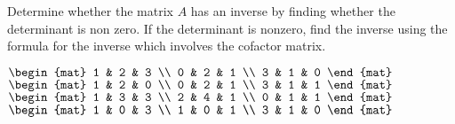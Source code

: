 
\begin{Exercise}[
name={},
title={}, 
difficulty=0,
origin={\cite{KK}}]
Determine whether the matrix $A$ has an inverse by finding whether the
determinant is non zero. If the determinant is nonzero, find the inverse
using the formula for the inverse which involves the cofactor matrix.
\begin{multicols}{2}
\Question $\begin{mat}
1 & 2 & 3 \\
0 & 2 & 1 \\
3 & 1 & 0
\end{mat}$
\Question $\begin{mat}
1 & 2 & 0 \\
0 & 2 & 1 \\
3 & 1 & 1
\end{mat}$
\Question $\begin{mat}
1 & 3 & 3 \\
2 & 4 & 1 \\
0 & 1 & 1
\end{mat}$
\Question $\begin{mat}
1 & 0 & 3 \\
1 & 0 & 1 \\
3 & 1 & 0
\end{mat}$
\EndCurrentQuestion
\end{multicols}
\end{Exercise}

